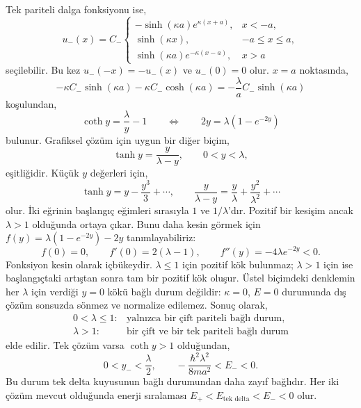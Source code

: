 \documentclass[00_kitap.tex]{subfiles}
\begin{document}
Tek pariteli dalga fonksiyonu ise,
\begin{equation}
 u_-(x)=C_-\begin{cases}
 -\sinh(\kappa a)e^{\kappa(x+a)},&x<-a,\\
 \sinh(\kappa x),&-a\le x\le a,\\
 \sinh(\kappa a)e^{-\kappa(x-a)},&x>a
 \end{cases}
 \label{eq:cift_delta_tek_df}
\end{equation}
seçilebilir. Bu kez $u_-(-x)=-u_-(x)$ ve $u_-(0)=0$ olur. $x=a$
noktasında,
\begin{equation}
 -\kappa C_-\sinh(\kappa a)-\kappa C_-\cosh(\kappa a)
 =-\frac{\lambda}{a}C_-\sinh(\kappa a)
\end{equation}
koşulundan,
\begin{equation}
 \boxed{\coth y=\frac{\lambda}{y}-1}
 \qquad\Longleftrightarrow\qquad
 \boxed{2y=\lambda(1-e^{-2y})}
 \label{eq:cift_delta_tek_ozdeger}
\end{equation}
bulunur. Grafiksel çözüm için uygun bir diğer biçim,
\begin{equation}
 \tanh y=\frac{y}{\lambda-y},\qquad 0<y<\lambda,
 \label{eq:cift_delta_tek_tanh}
\end{equation}
eşitliğidir. Küçük $y$ değerleri için,
\begin{equation}
 \tanh y=y-\frac{y^3}{3}+\cdots,\qquad
 \frac{y}{\lambda-y}=\frac{y}{\lambda}
             +\frac{y^2}{\lambda^2}+\cdots
\end{equation}
olur. İki eğrinin başlangıç eğimleri sırasıyla $1$ ve $1/\lambda$'dır.
Pozitif bir kesişim ancak $\lambda>1$ olduğunda ortaya çıkar.
Bunu daha kesin görmek için
$f(y)=\lambda(1-e^{-2y})-2y$ tanımlayabiliriz:
\begin{equation}
 f(0)=0,\qquad f'(0)=2(\lambda-1),\qquad
 f''(y)=-4\lambda e^{-2y}<0.
\end{equation}
Fonksiyon kesin olarak içbükeydir. $\lambda\le1$ için pozitif kök
bulunmaz; $\lambda>1$ için ise başlangıçtaki artıştan sonra tam bir
pozitif kök oluşur. Üstel biçimdeki denklemin her $\lambda$ için
verdiği $y=0$ kökü bağlı durum değildir: $\kappa=0$, $E=0$ durumunda
dış çözüm sonsuzda sönmez ve normalize edilemez. Sonuç olarak,
\begin{equation}
 \boxed{\begin{array}{ll}
 0<\lambda\le1:&\text{yalnızca bir çift pariteli bağlı durum},\\
 \lambda>1:&\text{bir çift ve bir tek pariteli bağlı durum}
 \end{array}}
 \label{eq:cift_delta_durum_sayisi}
\end{equation}
elde edilir. Tek çözüm varsa $\coth y>1$ olduğundan,
\begin{equation}
 0<y_-<\frac{\lambda}{2},\qquad
 -\frac{\hbar^2\lambda^2}{8ma^2}<E_-<0.
\end{equation}
Bu durum tek delta kuyusunun bağlı durumundan daha zayıf bağlıdır.
Her iki çözüm mevcut olduğunda enerji sıralaması
$E_+<E_{\text{tek delta}}<E_-<0$ olur.
\end{document}
